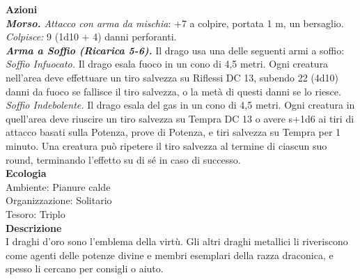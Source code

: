 \begin{multicols}{2}
\smallskip\textbf{Azioni}\\
\emph{\textbf{Morso.} Attacco con arma da mischia}: +7 a colpire, portata 1 m, un bersaglio.\\
\emph{Colpisce:} 9 (1d10 + 4) danni perforanti.\\
\emph{\textbf{Arma a Soffio (Ricarica 5-6).}} Il drago usa una delle seguenti armi a soffio:\\
\emph{Soffio Infuocato.} Il drago esala fuoco in un cono di 4,5 metri. Ogni creatura nell'area deve effettuare un tiro salvezza su Riflessi DC 13, subendo 22 (4d10) danni da fuoco se fallisce il tiro salvezza, o la metà di questi danni se lo riesce.\\
\emph{Soffio Indebolente.} Il drago esala del gas in un cono di 4,5 metri. Ogni creatura in quell'area deve riuscire un tiro salvezza su Tempra DC 13 o avere s+1d6 ai tiri di attacco basati sulla Potenza, prove di Potenza, e tiri salvezza su Tempra per 1 minuto. Una creatura può ripetere il tiro salvezza al termine di ciascun suo round, terminando l'effetto su di sé in caso di successo.\\
\textbf{Ecologia}\\
Ambiente: Pianure calde\\
Organizzazione: Solitario\\
Tesoro: Triplo\\
\textbf{Descrizione}\\
I draghi d'oro sono l'emblema della virtù. Gli altri draghi metallici li riveriscono come agenti delle potenze divine e membri esemplari della razza draconica, e spesso li cercano per consigli o aiuto.\\


\end{multicols}
